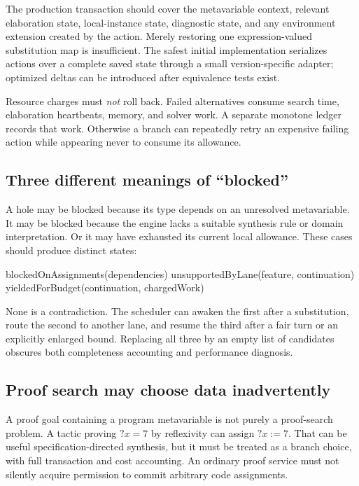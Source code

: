 \documentclass[11pt,letterpaper]{article}
\theoremstyle{definition}
\theoremstyle{remark}
\begin{document}
The production transaction should cover the metavariable context, relevant elaboration state, local-instance state, diagnostic state, and any environment extension created by the action. Merely restoring one expression-valued substitution map is insufficient. The safest initial implementation serializes actions over a complete saved state through a small version-specific adapter; optimized deltas can be introduced after equivalence tests exist.

Resource charges must \emph{not} roll back. Failed alternatives consume search time, elaboration heartbeats, memory, and solver work. A separate monotone ledger records that work. Otherwise a branch can repeatedly retry an expensive failing action while appearing never to consume its allowance.

\subsection{Three different meanings of ``blocked''}

A hole may be blocked because its type depends on an unresolved metavariable. It may be blocked because the engine lacks a suitable synthesis rule or domain interpretation. Or it may have exhausted its current local allowance. These cases should produce distinct states:

\begin{code}
blockedOnAssignments(dependencies)
unsupportedByLane(feature, continuation)
yieldedForBudget(continuation, chargedWork)
\end{code}

None is a contradiction. The scheduler can awaken the first after a substitution, route the second to another lane, and resume the third after a fair turn or an explicitly enlarged bound. Replacing all three by an empty list of candidates obscures both completeness accounting and performance diagnosis.

\subsection{Proof search may choose data inadvertently}

A proof goal containing a program metavariable is not purely a proof-search problem. A tactic proving $?x=7$ by reflexivity can assign $?x:=7$. That can be useful specification-directed synthesis, but it must be treated as a branch choice, with full transaction and cost accounting. An ordinary proof service must not silently acquire permission to commit arbitrary code assignments.
\end{document}
